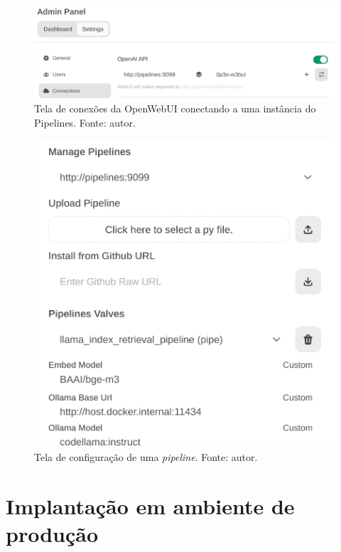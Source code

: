 \documentclass[journal]{IEEEtran}
\begin{document}
\begin{figure}[ht!]
    \centering
    \includegraphics[width=\textwidth,trim=0 0 0 10, clip]{media/openwebui_connections.png}
    \caption{Tela de conexões da OpenWebUI conectando a uma instância do Pipelines. Fonte: autor.\label{fig:openwebui_connections}}
\end{figure}

\begin{figure}[ht!]
    \centering
    \includegraphics[width=\columnwidth]{media/openwebui_pipeline_config_trim.png}
    \caption{Tela de configuração de uma \textit{pipeline}. Fonte: autor.\label{fig:openwebui_pipeline_config}}
\end{figure}

\section{Implantação em ambiente de produção\label{sec:deploy_prod}}
\end{document}
